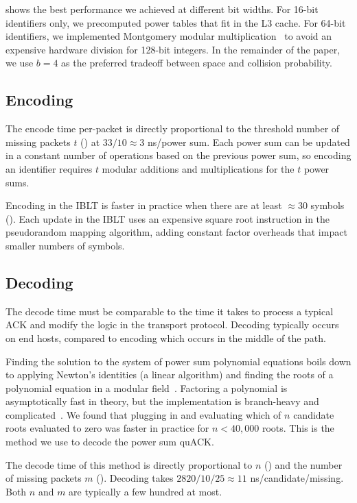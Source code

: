  shows the best performance we achieved at different bit
widths. For 16-bit identifiers only, we precomputed power tables that fit in
the L3 cache. For 64-bit identifiers, we implemented Montgomery modular
multiplication~\cite{montgomery1985modular} to avoid an expensive hardware
division for 128-bit integers. In the remainder of the paper, we use $b=4$ as
the preferred tradeoff between space and collision probability.

\subsection{Encoding}

The encode time per-packet is directly proportional to
the threshold number of missing packets $t$ () at
$33/10 \approx 3$ ns/power sum.
Each power sum can be updated in a constant number of operations based on the
previous power sum, so encoding an identifier requires $t$ modular additions
and multiplications for the $t$ power sums.

Encoding in the IBLT is faster in practice when there are at least
$\approx\!30$ symbols ().
Each update in the IBLT uses an expensive square root instruction in the
pseudorandom mapping algorithm, adding constant factor overheads that impact
smaller numbers of symbols.

\subsection{Decoding}

The decode time must be comparable to the time it takes to process a typical
ACK and modify the logic in the transport protocol. Decoding typically
occurs on end hosts, compared to encoding which occurs in the middle of the path.

Finding the solution to the system of power sum polynomial equations boils down
to applying Newton's identities (a linear algorithm) and finding the roots of a
polynomial equation
in a modular field~\cite{eppstein2011straggler}.
Factoring a polynomial is asymptotically fast in theory, but the implementation
is branch-heavy and complicated~\cite{batut2000user}.
We found that plugging in and evaluating which of $n$ candidate roots
evaluated to zero was faster in practice for $n < 40,000$ roots.
This is the method we use to decode the power sum quACK.

The decode time of this method is directly proportional to $n$ ()
and the number of missing packets $m$ ().
Decoding takes $2820/10/25 \approx 11$ ns/candidate/missing.
Both $n$ and $m$ are typically a few hundred at most.

